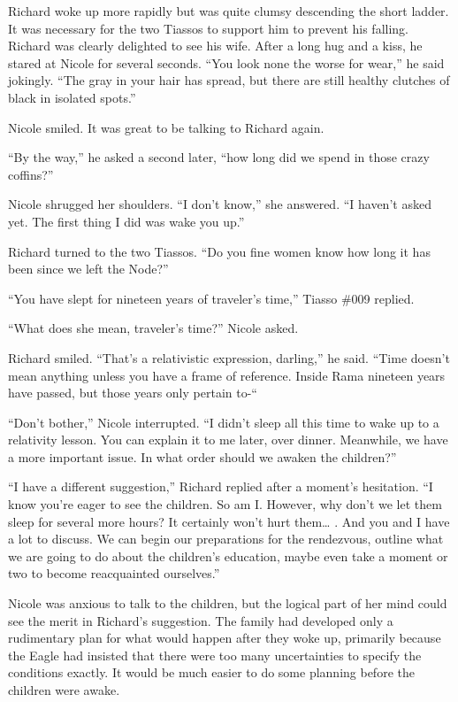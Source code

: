 \documentclass[]{article}
\begin{document}
{Richard woke up more rapidly but was quite clumsy descending the short ladder.  It was necessary for the two Tiassos to support him to prevent his falling.  Richard was clearly delighted to see his wife.  After a long hug and a kiss, he stared at Nicole for several seconds.  “You look none the worse for wear,” he said jokingly.  “The gray in your hair has spread, but there are still healthy clutches of black in isolated spots.”

Nicole smiled.  It was great to be talking to Richard again.

“By the way,” he asked a second later, “how long did we spend in those crazy coffins?”

Nicole shrugged her shoulders.  “I don’t know,” she answered.  “I haven’t asked yet.  The first thing I did was wake you up.”

Richard turned to the two Tiassos.  “Do you fine women know how long it has been since we left the Node?”

“You have slept for nineteen years of traveler’s time,” Tiasso \#009 replied.

“What does she mean, traveler’s time?” Nicole asked.

Richard smiled.  “That’s a relativistic expression, darling,” he said.  “Time doesn’t mean anything unless you have a frame of reference.  Inside Rama nineteen years have passed, but those years only pertain to-“

“Don’t bother,” Nicole interrupted.  “I didn’t sleep all this time to wake up to a relativity lesson.  You can explain it to me later, over dinner.  Meanwhile, we have a more important issue.  In what order should we awaken the children?”

“I have a different suggestion,” Richard replied after a moment’s hesitation.  “I know you’re eager to see the children.  So am I.  However, why don’t we let them sleep for several more hours? It certainly won’t hurt them… .  And you and I have a lot to discuss.  We can begin our preparations for the rendezvous, outline what we are going to do about the children’s education, maybe even take a moment or two to become reacquainted ourselves.”

Nicole was anxious to talk to the children, but the logical part of her mind could see the merit in Richard’s suggestion.  The family had developed only a rudimentary plan for what would happen after they woke up, primarily because the Eagle had insisted that there were too many uncertainties to specify the conditions exactly.  It would be much easier to do some planning before the children were awake.

}
\end{document}
